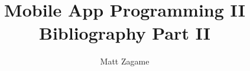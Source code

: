 \documentclass[11pt]{article}
\begin{document}
\title{Mobile App Programming II Bibliography Part II}
\author{Matt Zagame}
\maketitle
\nocite{*}

\end{document}
